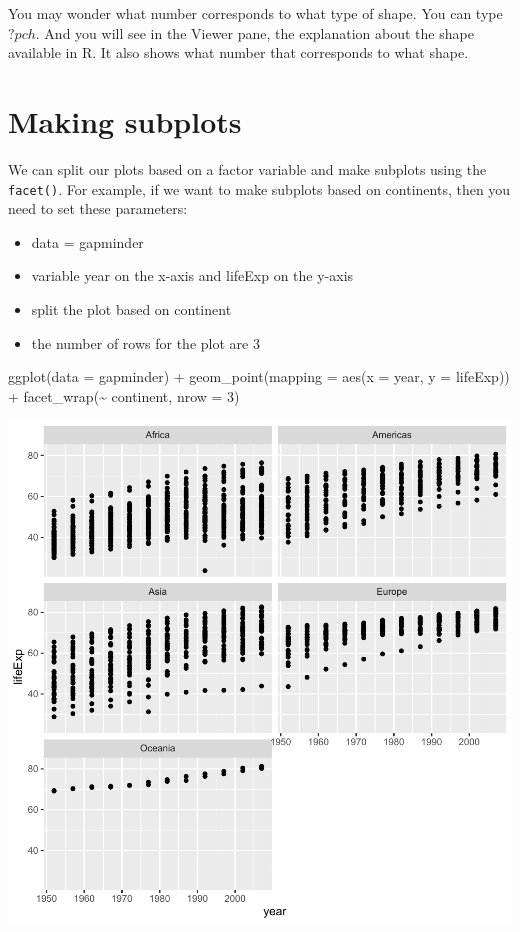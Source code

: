 \documentclass[
]{book}
\makeatletter
\newenvironment{Shaded}{\begin{snugshade}}{\end{snugshade}}
\newcommand{\AttributeTok}[1]{\textcolor[rgb]{0.61,0.61,0.61}{#1}}
\newcommand{\DecValTok}[1]{\textcolor[rgb]{0.06,0.06,0.06}{#1}}
\newcommand{\FunctionTok}[1]{\textcolor[rgb]{0,0,0}{#1}}
\newcommand{\NormalTok}[1]{#1}
\newcommand{\SpecialCharTok}[1]{\textcolor[rgb]{0,0,0}{#1}}
\providecommand{\tightlist}{%
  \setlength{\itemsep}{0pt}\setlength{\parskip}{0pt}}
\newenvironment{kframe}{%
\medskip{}
\setlength{\fboxsep}{.8em}
 \def\at@end@of@kframe{}%
 \ifinner\ifhmode%
  \def\at@end@of@kframe{\end{minipage}}%
  \begin{minipage}{\columnwidth}%
 \fi\fi%
 \def\FrameCommand##1{\hskip\@totalleftmargin \hskip-\fboxsep
 \colorbox{shadecolor}{##1}\hskip-\fboxsep
     \hskip-\linewidth \hskip-\@totalleftmargin \hskip\columnwidth}%
 \MakeFramed {\advance\hsize-\width
   \@totalleftmargin\z@ \linewidth\hsize
   \@setminipage}}%
 {\par\unskip\endMakeFramed%
 \at@end@of@kframe}
\renewenvironment{Shaded}{\begin{kframe}}{\end{kframe}}
\makeatother
\begin{document}
You may wonder what number corresponds to what type of shape. You can type \(?pch\). And you will see in the Viewer pane, the explanation about the shape available in R. It also shows what number that corresponds to what shape.

\hypertarget{making-subplots}{%
\section{Making subplots}\label{making-subplots}}

We can split our plots based on a factor variable and make subplots using the \texttt{facet()}. For example, if we want to make subplots based on continents, then you need to set these parameters:

\begin{itemize}
\tightlist
\item
  data = gapminder
\item
  variable year on the x-axis and lifeExp on the y-axis
\item
  split the plot based on continent
\item
  the number of rows for the plot are 3
\end{itemize}

\begin{Shaded}
\begin{Highlighting}[]
\FunctionTok{ggplot}\NormalTok{(}\AttributeTok{data =}\NormalTok{ gapminder) }\SpecialCharTok{+}
  \FunctionTok{geom\_point}\NormalTok{(}\AttributeTok{mapping =} \FunctionTok{aes}\NormalTok{(}\AttributeTok{x =}\NormalTok{ year, }\AttributeTok{y =}\NormalTok{ lifeExp)) }\SpecialCharTok{+} 
  \FunctionTok{facet\_wrap}\NormalTok{(}\SpecialCharTok{\textasciitilde{}}\NormalTok{ continent, }\AttributeTok{nrow =} \DecValTok{3}\NormalTok{)}
\end{Highlighting}
\end{Shaded}

\begin{center}\includegraphics[width=0.7\linewidth,keepaspectratio]{Multivariable_Data_Analysis_files/figure-latex/unnamed-chunk-23-1} \end{center}
\end{document}
